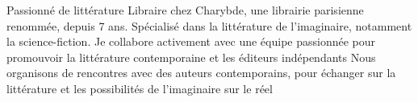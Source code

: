

\begin{cvskills}


  \cvskill
    {Passionné de littérature} %
    {Libraire chez Charybde, une librairie parisienne renommée, depuis 7 ans. \newline Spécialisé dans la littérature de l'imaginaire, notamment la science-fiction. \newline Je collabore activement avec une équipe passionnée   \newline pour promouvoir la littérature contemporaine et les éditeurs indépendants \newline Nous organisons de rencontres avec des auteurs contemporains, pour échanger \newline sur la littérature et les possibilités de l'imaginaire sur le réel} %

\end{cvskills}
